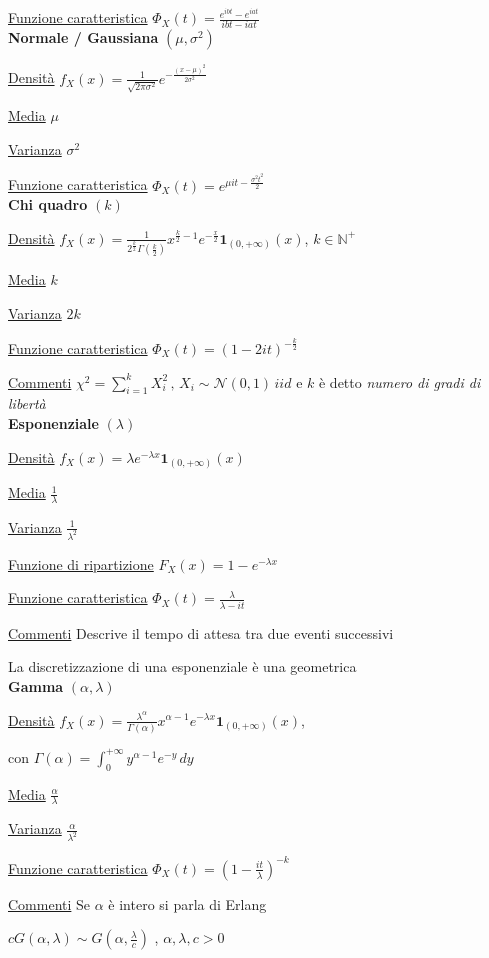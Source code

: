 \documentclass[openany]{book} %
\begin{document}
\begin{multicols}{2}
\underline{Funzione caratteristica} $\Phi_X(t)=\frac{e^{ibt}-e^{iat}}{ibt-iat}$
\\

\textbf{Normale / Gaussiana} $(\mu,\sigma^2)$

\underline{Densità} $f_X(x) = \frac{1}{\sqrt{2\pi\sigma^2}}e^{-\frac{(x-\mu)^2}{2\sigma^2}}$

\underline{Media} $\mu$

\underline{Varianza} $\sigma^2$

\underline{Funzione caratteristica} $\Phi_X(t)=e^{\mu it-\frac{\sigma^2t^2}{2}}$
\\

\textbf{Chi quadro} $(k)$

\underline{Densità} $f_X(x) = \frac{1}{2^{\frac{k}{2}}\Gamma(\frac{k}{2})}x^{\frac{k}{2}-1}e^{-\frac{x}{2}}\boldsymbol{1}_{(0,+\infty)}(x)$, $k\in \mathbb{N}^+$

\underline{Media} $k$

\underline{Varianza} $2k$

\underline{Funzione caratteristica} $\Phi_X(t)= (1-2it)^{-\frac{k}{2}}$

\underline{Commenti} $\chi^2=\sum_{i=1}^k X_i^2\,,\,X_i\sim \mathcal{N}(0,1)\,iid$  e $k$ è detto \textit{numero di gradi di libertà}
\\

\textbf{Esponenziale} $(\lambda)$

\underline{Densità} $f_X(x) = \lambda e^{-\lambda x}\boldsymbol{1}_{(0,+\infty)}(x)$

\underline{Media} $\frac{1}{\lambda}$

\underline{Varianza} $\frac{1}{\lambda^2}$

\underline{Funzione di ripartizione} $F_X(x)=1-e^{-\lambda x}$

\underline{Funzione caratteristica} $\Phi_X(t)=\frac{\lambda}{\lambda-it}$

\underline{Commenti} Descrive il tempo di attesa tra due eventi successivi

La discretizzazione di una esponenziale è una geometrica
\\

\textbf{Gamma} $(\alpha, \lambda)$

\underline{Densità} $f_X(x) = \frac{\lambda^\alpha}{\Gamma(\alpha)}x^{\alpha-1}e^{-\lambda x}\boldsymbol{1}_{(0,+\infty)}(x)$,

con $\Gamma(\alpha)=\int_0^{+\infty} y^{\alpha-1}e^{-y}\,dy$

\underline{Media} $\frac{\alpha}{\lambda}$

\underline{Varianza} $\frac{\alpha}{\lambda^2}$

\underline{Funzione caratteristica} $\Phi_X(t)=\left(1-\frac{it}{\lambda}\right)^{-k}$

\underline{Commenti} Se $\alpha$ è intero si parla di Erlang 

$cG(\alpha, \lambda)\sim G(\alpha,\frac{\lambda}{c})$ , $\alpha,\lambda,c>0$

\end{multicols}
\end{document}
